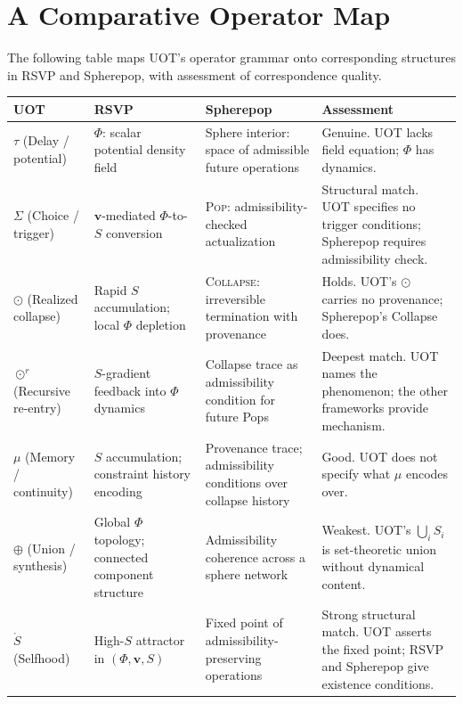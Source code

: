 \documentclass[12pt, oneside]{article}
\theoremstyle{plain-remark}
\newcommand{\utau}{\tau}
\newcommand{\uSigma}{\Sigma}
\newcommand{\umu}{\mu}
\newcommand{\ucollapse}{\odot}
\newcommand{\urcollapse}{\odot^r}
\newcommand{\uunion}{\oplus}
\newcommand{\uS}{\mathring{S}}
\newcommand{\Phif}{\Phi}
\newcommand{\vf}{\mathbf{v}}
\newcommand{\Sf}{S}
\begin{document}
\section{A Comparative Operator Map}

The following table maps UOT's operator grammar onto corresponding structures in RSVP
and Spherepop, with assessment of correspondence quality.

\vspace{0.5em}
\begin{longtable}{p{2.2cm} p{3.3cm} p{3.3cm} p{3.6cm}}
\toprule
\textbf{UOT} & \textbf{RSVP} & \textbf{Spherepop} & \textbf{Assessment} \\
\midrule
\endhead
$\utau$ (Delay / potential)
  & $\Phif$: scalar potential density field
  & Sphere interior: space of admissible future operations
  & Genuine. UOT lacks field equation; $\Phif$ has dynamics. \\
\addlinespace
$\uSigma$ (Choice / trigger)
  & $\vf$-mediated $\Phif$-to-$\Sf$ conversion
  & \textsc{Pop}: admissibility-checked actualization
  & Structural match. UOT specifies no trigger conditions; Spherepop requires admissibility check. \\
\addlinespace
$\ucollapse$ (Realized collapse)
  & Rapid $\Sf$ accumulation; local $\Phif$ depletion
  & \textsc{Collapse}: irreversible termination with provenance
  & Holds. UOT's $\ucollapse$ carries no provenance; Spherepop's Collapse does. \\
\addlinespace
$\urcollapse$ (Recursive re-entry)
  & $\Sf$-gradient feedback into $\Phif$ dynamics
  & Collapse trace as admissibility condition for future Pops
  & Deepest match. UOT names the phenomenon; the other frameworks provide mechanism. \\
\addlinespace
$\umu$ (Memory / continuity)
  & $\Sf$ accumulation; constraint history encoding
  & Provenance trace; admissibility conditions over collapse history
  & Good. UOT does not specify what $\umu$ encodes over. \\
\addlinespace
$\uunion$ (Union / synthesis)
  & Global $\Phif$ topology; connected component structure
  & Admissibility coherence across a sphere network
  & Weakest. UOT's $\bigcup_i S_i$ is set-theoretic union without dynamical content. \\
\addlinespace
$\uS$ (Selfhood)
  & High-$\Sf$ attractor in $(\Phif, \vf, \Sf)$
  & Fixed point of admissibility-preserving operations
  & Strong structural match. UOT asserts the fixed point; RSVP and Spherepop give existence conditions. \\
\bottomrule
\end{longtable}
\vspace{0.5em}
\end{document}
